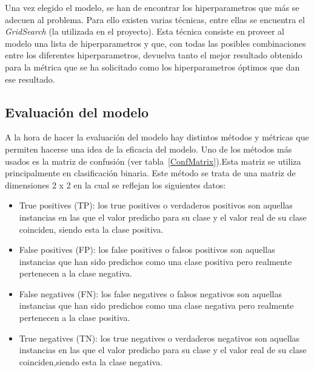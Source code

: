 Una vez elegido el modelo, se han de encontrar los hiperparametros que más se adecuen al problema. Para ello existen varias técnicas, entre ellas se encuentra el \textit{GridSearch} (la utilizada en el proyecto). Esta técnica consiste en proveer al modelo una lista de hiperparametros y que, con todas las posibles combinaciones entre los diferentes hiperparametros, devuelva tanto el mejor resultado obtenido para la métrica que se ha solicitado como los hiperparametros óptimos que dan ese resultado.




\subsection{Evaluación del modelo}


A la hora de hacer la evaluación del modelo hay distintos métodos y métricas que permiten hacerse una idea de la eficacia del modelo. Uno de los métodos más usados es la matriz de confusión (ver tabla~\ref{ConfMatrix}).Esta matriz se utiliza principalmente en clasificación binaria. Este método se trata de una matriz de dimensiones 2 x 2 en la cual se reflejan los siguientes datos:
\begin{itemize}
\item True positives (TP): los true positives o verdaderos positivos son aquellas instancias en las que el valor predicho para su clase y el valor real de su clase coinciden, siendo esta la clase positiva. 
\item False positives (FP): los false positives o falsos positivos son aquellas instancias que han sido predichos como una clase positiva pero realmente pertenecen a la clase negativa.
\item False negatives (FN): los false negatives o falsos negativos son aquellas instancias que han sido predichos como una clase negativa pero realmente pertenecen a la clase positiva.
\item True negatives (TN): los true negatives o verdaderos negativos son aquellas instancias en las que el valor predicho para su clase y el valor real de su clase coinciden,siendo esta la clase negativa. 
\end{itemize} 



